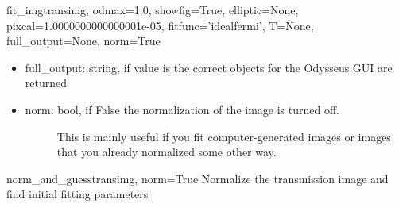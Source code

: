 \documentclass[letterpaper,10pt,english]{manual}
\begin{document}
\begin{funcdesc}{fit\_img}{transimg, odmax=1.0, showfig=True, elliptic=None, pixcal=1.0000000000000001e-05, fitfunc='idealfermi', T=None, full\_output=None, norm=True}
\begin{itemize}
\item {} 
full\_output: string, if value is  the correct objects for
the Odysseus GUI are returned

\item {} \begin{description}
\item[norm: bool, if False the normalization of the image is turned off.] \leavevmode
This is mainly useful if you fit computer-generated images or
images that you already normalized some other way.

\end{description}

\end{itemize}
\end{funcdesc}

\hypertarget{odysseus.fitfermions.norm_and_guess}{}\begin{funcdesc}{norm\_and\_guess}{transimg, norm=True}
Normalize the transmission image and find initial fitting parameters
\end{funcdesc}
\end{document}
